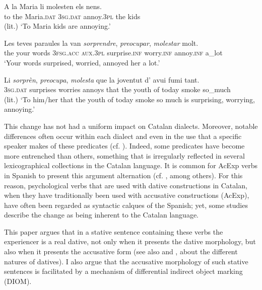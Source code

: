 \documentclass[output=paper,colorlinks,citecolor=brown,modfonts,nonflat]{langsci/langscibook}
\begin{document}
 \ex \label{ex:royo:1b}
 \gll A la Maria li molesten els nens.\\
 to the Maria.\textsc{dat} \textsc{3sg.dat} annoy.\textsc{3pl} the kids\\
 \glt  (lit.) ‘To Maria kids are annoying.’
 \z
 \z

\ea%
 \label{ex:royo:2} \citealt[77]{CabréMateu1998}
 \ea \label{ex:royo:2a}
 \gll Les teves paraules la van \emph{sorprendre}, \emph{preocupar}, \emph{molestar} molt.\\
the  your words     \textsc{3fsg.acc} \textsc{aux.3pl} surprise.\textsc{inf} worry.\textsc{inf}  annoy.\textsc{inf} a\_lot\\
 \glt ‘Your words surprised, worried, annoyed her a lot.’

 \ex \label{ex:royo:2b}
 \gll Li \emph{sorprèn}, \emph{preocupa}, \emph{molesta} que la joventut d’ avui fumi tant.\\
\textsc{3sg.dat} surprises worries    annoys  that the youth     of today smoke so\_much\\
 \glt	(lit.) ‘To him/her that the youth of today smoke so much is surprising, worrying, annoying.’

 \z
 \z


This change has not had a uniform impact on Catalan dialects. Moreover, notable differences often occur within each dialect and even in the use that a specific speaker makes of these predicates (cf. \citealt[70]{CabréMateu1998}). Indeed, some predicates have become more entrenched than others, something that is irregularly reflected in several lexicographical collections in the Catalan language. It is common for AcExp verbs in Spanish to present this argument alternation (cf. \citealt{MendivilGiro2005, MarínMcNally2011}, among others). For this reason, psychological verbs that are used with dative constructions in Catalan, when they have traditionally been used with accusative constructions (AcExp), have often been regarded as syntactic calques of the Spanish; yet, some studies describe the change as being inherent to the Catalan language.

This paper argues that in a stative sentence containing these verbs the experiencer is a real dative, not only when it presents the dative morphology, but also when it presents the accusative form (see also  and , about the different natures of datives). I also argue that the accusative morphology of such stative sentences is facilitated by a mechanism of differential indirect object marking (DIOM).
\end{document}
